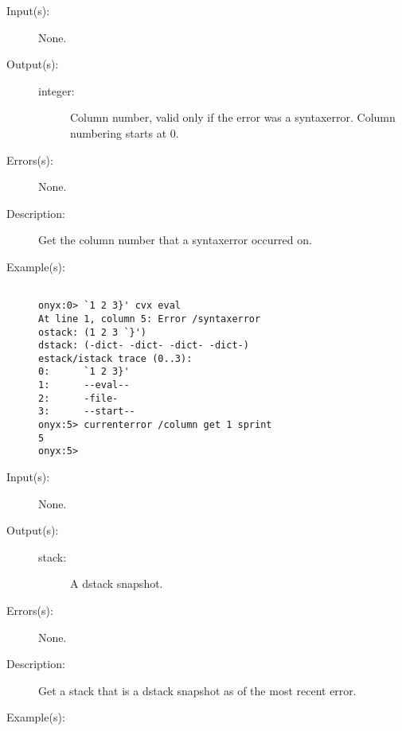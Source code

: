 \begin{description}
\label{currenterror:column}
\item[{\onyxop{--}{column}{integer}}: ]
	\begin{description}\item[]
	\item[Input(s): ] None.
	\item[Output(s): ]
		\begin{description}\item[]
		\item[integer: ]
			Column number, valid only if the error was a
			syntaxerror.  Column numbering starts at 0.
		\end{description}
	\item[Errors(s): ] None.
	\item[Description: ]
		Get the column number that a syntaxerror occurred on.
	\item[Example(s): ]\begin{verbatim}

onyx:0> `1 2 3}' cvx eval
At line 1, column 5: Error /syntaxerror
ostack: (1 2 3 `}')
dstack: (-dict- -dict- -dict- -dict-)
estack/istack trace (0..3):
0:      `1 2 3}'
1:      --eval--
2:      -file-
3:      --start--
onyx:5> currenterror /column get 1 sprint
5
onyx:5>
		\end{verbatim}
	\end{description}
\label{currenterror:dstack}
\item[{\onyxop{--}{dstack}{stack}}: ]
	\begin{description}\item[]
	\item[Input(s): ] None.
	\item[Output(s): ]
		\begin{description}\item[]
		\item[stack: ]
			A dstack snapshot.
		\end{description}
	\item[Errors(s): ] None.
	\item[Description: ]
		Get a stack that is a dstack snapshot as of the most recent
		error.
	\item[Example(s): ]\begin{verbatim}


\end{verbatim}
\end{description}
\end{description}
